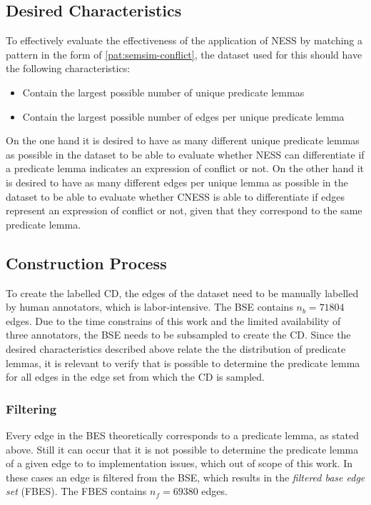 \documentclass[11pt]{scrreprt}
\begin{document}
\subsection{Desired Characteristics}
\label{sec:dataset-characteristics}
To effectively evaluate the effectiveness of the application of NESS by matching a pattern in the form of \cref{pat:semsim-conflict}, the dataset used for this should have the following characteristics:

\begin{itemize}
	\item Contain the largest possible number of unique predicate lemmas
	\item Contain the largest possible number of edges per unique predicate lemma
\end{itemize}

On the one hand it is desired to have as many different unique predicate lemmas as possible in the dataset to be able to evaluate whether NESS can differentiate if a predicate lemma indicates an expression of conflict or not. On the other hand it is desired to have as many different edges per unique lemma as possible in the dataset to be able to evaluate whether CNESS is able to differentiate if edges represent an expression of conflict or not, given that they correspond to the same predicate lemma.

\subsection{Construction Process}
To create the labelled CD, the edges of the dataset need to be manually labelled by human annotators, which is labor-intensive. The BSE contains \(n_b=71804\) edges. Due to the time constrains of this work and the limited availability of three annotators, the BSE needs to be subsampled to create the CD. Since the desired characteristics described above relate the the distribution of predicate lemmas, it is relevant to verify that is possible to determine the predicate lemma for all edges in the edge set from which the CD is sampled.

\subsubsection{Filtering}
Every edge in the BES theoretically corresponds to a predicate lemma, as stated above. Still it can occur that it is not possible to determine the predicate lemma of a given edge to to implementation issues, which out of scope of this work. In these cases an edge is filtered from the BSE, which results in the \textit{filtered base edge set} (FBES). The FBES contains \(n_{f} = 69 380\) edges. 
\end{document}
